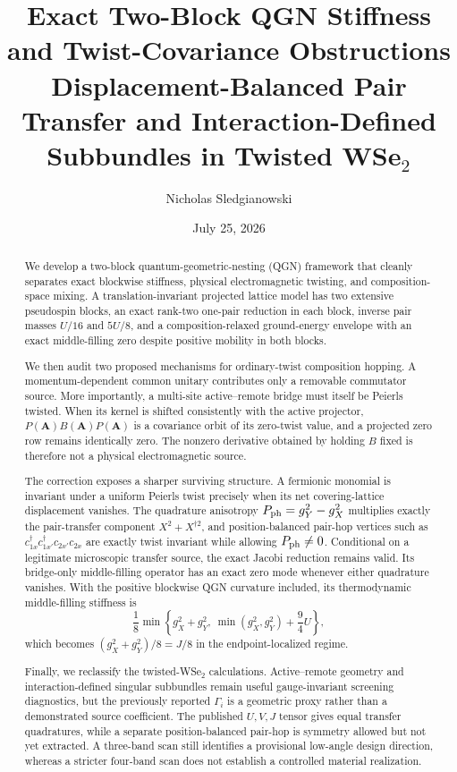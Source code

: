 \documentclass[11pt]{article}
\title{\textbf{Exact Two-Block QGN Stiffness and Twist-Covariance Obstructions}\\[0.35em]
\large Displacement-Balanced Pair Transfer and Interaction-Defined Subbundles in Twisted WSe$_2$}
\author{Nicholas Sledgianowski}
\date{July 25, 2026}
\theoremstyle{remark}
\begin{document}
\maketitle

\begin{abstract}
We develop a two-block quantum-geometric-nesting (QGN) framework that cleanly separates exact blockwise stiffness, physical electromagnetic twisting, and composition-space mixing.  A translation-invariant projected lattice model has two extensive pseudospin blocks, an exact rank-two one-pair reduction in each block, inverse pair masses $U/16$ and $5U/8$, and a composition-relaxed ground-energy envelope with an exact middle-filling zero despite positive mobility in both blocks.

We then audit two proposed mechanisms for ordinary-twist composition hopping.  A momentum-dependent common unitary contributes only a removable commutator source.  More importantly, a multi-site active--remote bridge must itself be Peierls twisted.  When its kernel is shifted consistently with the active projector, $P(\bm A)B(\bm A)P(\bm A)$ is a covariance orbit of its zero-twist value, and a projected zero row remains identically zero.  The nonzero derivative obtained by holding $B$ fixed is therefore not a physical electromagnetic source.

The correction exposes a sharper surviving structure.  A fermionic monomial is invariant under a uniform Peierls twist precisely when its net covering-lattice displacement vanishes.  The quadrature anisotropy $P_{\rm ph}=g_Y^2-g_X^2$ multiplies exactly the pair-transfer component $X^2+X^{\dagger2}$, and position-balanced pair-hop vertices such as $c_{1x}^\dagger c_{1x'}^\dagger c_{2x'}c_{2x}$ are exactly twist invariant while allowing $P_{\rm ph}\ne0$.  Conditional on a legitimate microscopic transfer source, the exact Jacobi reduction remains valid.  Its bridge-only middle-filling operator has an exact zero mode whenever either quadrature vanishes.  With the positive blockwise QGN curvature included, its thermodynamic middle-filling stiffness is
\[
 \frac18\min\left\{g_X^2+g_Y^2,\ \min(g_X^2,g_Y^2)+\frac94U\right\},
\]
which becomes $(g_X^2+g_Y^2)/8=J/8$ in the endpoint-localized regime.

Finally, we reclassify the twisted-WSe$_2$ calculations.  Active--remote geometry and interaction-defined singular subbundles remain useful gauge-invariant screening diagnostics, but the previously reported $\Gamma_i$ is a geometric proxy rather than a demonstrated source coefficient.  The published $U,V,J$ tensor gives equal transfer quadratures, while a separate position-balanced pair-hop is symmetry allowed but not yet extracted.  A three-band scan still identifies a provisional low-angle design direction, whereas a stricter four-band scan does not establish a controlled material realization.
\end{abstract}
\end{document}
